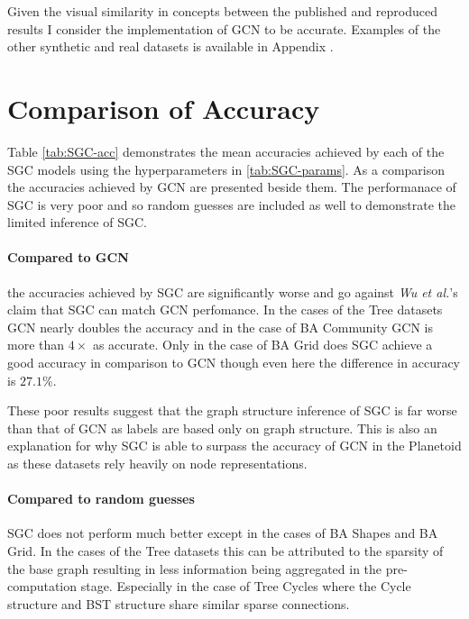 Given the visual similarity in concepts between the published and reproduced results I consider the implementation of GCN to be accurate.
Examples of the other synthetic and real datasets is available in Appendix .

\section{Comparison of Accuracy}
\label{sec:comp-acc}


Table \ref{tab:SGC-acc} demonstrates the mean accuracies achieved by each of the SGC models using the hyperparameters in \ref{tab:SGC-params}.
As a comparison the accuracies achieved by GCN are presented beside them.
The performanace of SGC is very poor and so random guesses are included as well to demonstrate the limited inference of SGC.

\paragraph{Compared to GCN}
the accuracies achieved by SGC are significantly worse and go against \textit{Wu et al.}'s claim that SGC can match GCN perfomance.
In the cases of the Tree datasets GCN nearly doubles the accuracy and in the case of BA Community GCN is more than $4\times$ as accurate.
Only in the case of BA Grid does SGC achieve a good accuracy in comparison to GCN though even here the difference in accuracy is $27.1$\%.

These poor results suggest that the graph structure inference of SGC is far worse than that of GCN as labels are based only on graph structure.
This is also an explanation for why SGC is able to surpass the accuracy of GCN in the Planetoid\cite{Fey/Lenssen/2019} as these datasets rely heavily on node representations.

\paragraph{Compared to random guesses}
SGC does not perform much better except in the cases of BA Shapes and BA Grid.
In the cases of the Tree datasets this can be attributed to the sparsity of the base graph resulting in less information being aggregated in the pre-computation stage.
Especially in the case of Tree Cycles where the Cycle structure and BST structure share similar sparse connections.

